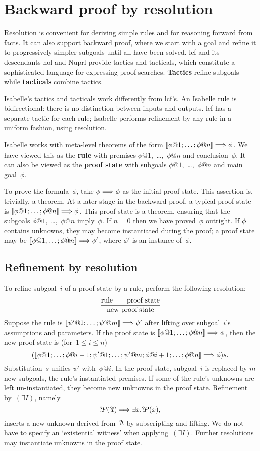 \section{Backward proof by resolution}

Resolution is convenient for deriving simple rules and for reasoning
forward from facts. It can also support backward proof, where we start
with a goal and refine it to progressively simpler subgoals until all have
been solved.  {\sc lcf} and its descendants {\sc hol} and Nuprl provide
tactics and tacticals, which constitute a sophisticated language for
expressing proof searches.  {\bf Tactics} refine subgoals while {\bf
tacticals} combine tactics.

Isabelle's tactics and tacticals work differently from {\sc lcf}'s. An
Isabelle rule is bidirectional: there is no distinction between
inputs and outputs.  {\sc lcf} has a separate tactic for each rule;
Isabelle performs refinement by any rule in a uniform fashion, using
resolution.

Isabelle works with meta-level theorems of the form
\( \List{\phi@1; \ldots; \phi@n} \Imp \phi \).
We have viewed this as the {\bf rule} with premises
$\phi@1$,~\ldots,~$\phi@n$ and conclusion~$\phi$. It can also be viewed as
the {\bf proof state}
with subgoals $\phi@1$,~\ldots,~$\phi@n$ and main
goal~$\phi$.

To prove the formula~$\phi$, take $\phi\Longrightarrow \phi$ as the initial proof
state. This assertion is, trivially, a theorem. At a later stage in the
backward proof, a typical proof state is $\List{\phi@1; \ldots; \phi@n}
\Imp \phi$. This proof state is a theorem, ensuring that the subgoals
$\phi@1$,~\ldots,~$\phi@n$ imply~$\phi$. If $n=0$ then we have
proved~$\phi$ outright. If $\phi$ contains unknowns, they may become
instantiated during the proof; a proof state may be $\List{\phi@1; \ldots;
\phi@n} \Imp \phi'$, where $\phi'$ is an instance of~$\phi$.

\subsection{Refinement by resolution}
To refine subgoal~$i$ of a proof state by a rule, perform the following
resolution:
\[ \infer{\hbox{new proof state}}{\hbox{rule} & & \hbox{proof state}} \]
Suppose the rule is $\mathopen{[\![}\psi'@1; \ldots; \psi'@m\mathclose{]\!]} \Longrightarrow \psi'$ after
lifting over subgoal~$i$'s assumptions and parameters. If the proof state
is $\List{\phi@1; \ldots; \phi@n} \Imp \phi$, then the new proof state is
(for~$1\leq i\leq n$)
\[ (\List{\phi@1; \ldots; \phi@{i-1}; \psi'@1;
\ldots; \psi'@m; \phi@{i+1}; \ldots; \phi@n} \Imp \phi)s.  \]
Substitution~$s$ unifies $\psi'$ with~$\phi@i$. In the proof state,
subgoal~$i$ is replaced by $m$ new subgoals, the rule's instantiated premises.
If some of the rule's unknowns are left un-instantiated, they become new
unknowns in the proof state. Refinement by~$(\exists I)$, namely
\[ {?\!P}({?\!t}) \Longrightarrow \exists x. {?\!P}(x), \]
inserts a new unknown derived from~${?\!t}$ by subscripting and lifting.
We do not have to specify an `existential witness' when
applying~$(\exists I)$. Further resolutions may instantiate unknowns in
the proof state.

